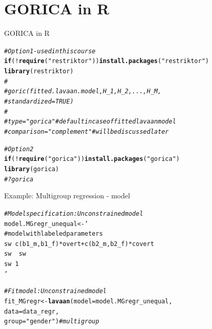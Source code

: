 \documentclass[10pt]{beamer}\usepackage[]{graphicx}\usepackage[]{xcolor}
\makeatletter
\newcommand{\hlstr}[1]{\textcolor[rgb]{0.192,0.494,0.8}{#1}}%
\newcommand{\hlcom}[1]{\textcolor[rgb]{0.678,0.584,0.686}{\textit{#1}}}%
\newcommand{\hlopt}[1]{\textcolor[rgb]{0,0,0}{#1}}%
\newcommand{\hlstd}[1]{\textcolor[rgb]{0.345,0.345,0.345}{#1}}%
\newcommand{\hlkwa}[1]{\textcolor[rgb]{0.161,0.373,0.58}{\textbf{#1}}}%
\newcommand{\hlkwb}[1]{\textcolor[rgb]{0.69,0.353,0.396}{#1}}%
\newcommand{\hlkwc}[1]{\textcolor[rgb]{0.333,0.667,0.333}{#1}}%
\newcommand{\hlkwd}[1]{\textcolor[rgb]{0.737,0.353,0.396}{\textbf{#1}}}%
\newenvironment{kframe}{%
 \def\at@end@of@kframe{}%
 \ifinner\ifhmode%
  \def\at@end@of@kframe{\end{minipage}}%
  \begin{minipage}{\columnwidth}%
 \fi\fi%
 \def\FrameCommand##1{\hskip\@totalleftmargin \hskip-\fboxsep
 \colorbox{shadecolor}{##1}\hskip-\fboxsep
     \hskip-\linewidth \hskip-\@totalleftmargin \hskip\columnwidth}%
 \MakeFramed {\advance\hsize-\width
   \@totalleftmargin\z@ \linewidth\hsize
   \@setminipage}}%
 {\par\unskip\endMakeFramed%
 \at@end@of@kframe}
\newenvironment{knitrout}{}{} %
\makeatother
\begin{document}
\section{GORICA in R}
%
%
\begin{frame}[fragile]{GORICA in R}

\begin{knitrout}
\color{fgcolor}\begin{kframe}
\begin{alltt}
\hlcom{# Option 1 - used in this course}
\hlkwa{if} \hlstd{(}\hlopt{!}\hlkwd{require}\hlstd{(}\hlstr{"restriktor"}\hlstd{))} \hlkwd{install.packages}\hlstd{(}\hlstr{"restriktor"}\hlstd{)}
\hlkwd{library}\hlstd{(restriktor)}
\hlcom{#}
\hlcom{#goric(fitted.lavaan.model, H_1, H_2, ..., H_M,}
\hlcom{#      standardized = TRUE)}
\hlcom{#}
\hlcom{#type = "gorica" # default in case of fitted lavaan model}
\hlcom{#comparison = "complement" # will be discussed later}

\hlcom{# Option 2}
\hlkwa{if} \hlstd{(}\hlopt{!}\hlkwd{require}\hlstd{(}\hlstr{"gorica"}\hlstd{))} \hlkwd{install.packages}\hlstd{(}\hlstr{"gorica"}\hlstd{)}
\hlkwd{library}\hlstd{(gorica)}
\hlcom{#?gorica}
\end{alltt}
\end{kframe}
\end{knitrout}
          
\end{frame}
%
\begin{frame}[fragile]{Example: Multigroup regression - model}

\begin{knitrout}
\color{fgcolor}\begin{kframe}
\begin{alltt}
\hlcom{# Model specification: Unconstrained model}
\hlstd{model.MGregr_unequal} \hlkwb{<-} \hlstr{'
  # model with labeled parameters
  sw ~ c(b1_m,b1_f)*overt + c(b2_m,b2_f)*covert 
  sw ~~ sw                                      
  sw ~ 1                                        
'}

\hlcom{# Fit model: Unconstrained model}
\hlstd{fit_MGregr} \hlkwb{<-} \hlkwd{lavaan}\hlstd{(}\hlkwc{model} \hlstd{= model.MGregr_unequal,}
                    \hlkwc{data} \hlstd{= data_regr,}
                    \hlkwc{group} \hlstd{=} \hlstr{"gender"}\hlstd{)} \hlcom{# multigroup}
\end{alltt}
\end{kframe}
\end{knitrout}
          
\end{frame}
\end{document}
